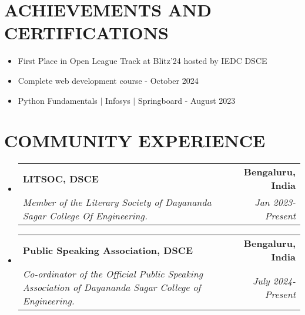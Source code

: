 \documentclass[a4paper,11pt]{article}
\makeatletter
\newcommand{\resumeItem}[1]{
  \item\small{
    {#1 \vspace{-2pt}}
  }
}
\newcommand{\resumeSubheading}[4]{
  \vspace{-2pt}\item
    \begin{tabular*}{1.0\textwidth}[t]{l@{\extracolsep{\fill}}r}
      \textbf{#1} & \textbf{\small #2} \\
      \textit{\small#3} & \textit{\small #4} \\
    \end{tabular*}\vspace{-7pt}
}
\newcommand{\resumeSubItem}[1]{\resumeItem{#1}\vspace{-4pt}}
\newcommand{\resumeSubHeadingListStart}{\begin{itemize}[leftmargin=0.0in, label={}]}
\newcommand{\resumeSubHeadingListEnd}{\end{itemize}}
\makeatother
\begin{document}
 \vspace{-10pt}
\section{ACHIEVEMENTS AND CERTIFICATIONS}
\resumeSubHeadingListStart
\resumeSubItem{First Place in Open League Track at Blitz'24 hosted by IEDC DSCE}{}
\vspace{2pt}
\resumeSubItem{Complete web development course - October 2024}{}
\vspace{2pt}
\resumeSubItem{Python Fundamentals $|$  Infosys $|$  Springboard - August 2023}{}
\vspace{2pt}
\resumeSubHeadingListEnd
\vspace{-5pt}



     \vspace{10pt}
     \section{COMMUNITY EXPERIENCE}
\resumeSubHeadingListStart
    \resumeSubheading
        {LITSOC, DSCE}{Bengaluru, India}
        {Member of the Literary Society of Dayananda Sagar College Of Engineering.}{Jan 2023-Present}
    \resumeSubheading
        {Public Speaking Association, DSCE}{Bengaluru, India}
        {Co-ordinator of the Official Public Speaking Association of Dayananda Sagar College of Engineering.}{July 2024-Present}
\resumeSubHeadingListEnd
\end{document}
